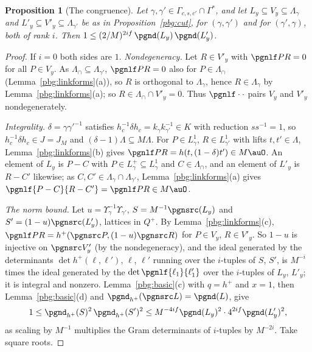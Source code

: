 \documentclass[10pt]{amsart}
\newtheorem{proposition}[theorem]{Proposition}
\theoremstyle{definition}
\theoremstyle{remark}
\begin{document}
\begin{proposition}[The congruence]\label{pbg:congr}
Let $\gamma,\gamma'\in\Gamma_{c,s,c'}\cap\Gamma^*$, and let $L_y\subseteq V_y\subseteq\Lambda_\gamma$ and
$L'_y\subseteq V'_y\subseteq\Lambda_{\gamma'}$ be as in Proposition~\ref{pbg:cut}, for $(\gamma,\gamma')$
and for $(\gamma',\gamma)$, both of rank $i$. Then $1\le(2/M)^{2if}\,\pgnd(L_y)\,\pgnd(L'_y)$.
\end{proposition}
\begin{proof}
If $i=0$ both sides are $1$. \emph{Nondegeneracy.} Let $R\in V'_y$ with $\pgnlf PR=0$ for all $P\in V_y$.
As $\Lambda_\cap\subseteq\Lambda_{\gamma'}$, $\pgnlf PR=0$ also for $P\in\Lambda_\cap$
(Lemma~\ref{pbg:linkforms}(a)), so $R$ is orthogonal to $\Lambda_\gamma$, hence $R\in\Lambda_\gamma$ by
Lemma~\ref{pbg:linkforms}(a); so $R\in\Lambda_\cap\cap V'_y=0$. Thus $\pgnlf\cdot\cdot$ pairs $V_y$ and
$V'_y$ nondegenerately.

\emph{Integrality.} $\delta=\gamma\gamma'^{-1}$ satisfies $h_c^{-1}\delta h_c=k_\gamma k_{\gamma'}^{-1}\in K$
with reduction $ss^{-1}=1$, so $h_c^{-1}\delta h_c\in J=J_M$ and $(\delta-1)\Lambda\subseteq M\Lambda$.
For $P\in L^1_\gamma$, $R\in L^1_{\gamma'}$ with lifts $t,t'\in\Lambda$, Lemma~\ref{pbg:linkforms}(b)
gives $\pgnlf PR=h(t,(1-\delta)t')\in M\auO$. An element of $L_y$ is $P-C$ with $P\in L^+_\gamma\subseteq
L^1_\gamma$ and $C\in\Lambda_\cap$, and an element of $L'_y$ is $R-C'$ likewise; as $C,C'\in\Lambda_
\gamma\cap\Lambda_{\gamma'}$, Lemma~\ref{pbg:linkforms}(a) gives $\pgnlf{P-C}{R-C'}=\pgnlf PR\in M\auO$.

\emph{The norm bound.} Let $u=\Upsilon_\gamma^{-1}\Upsilon_{\gamma'}$, $S=M^{-1}\pgnsrc(L_y)$ and $S'=(1-u)
\pgnsrc(L'_y)$, lattices in $Q^+$. By Lemma~\ref{pbg:linkforms}(c), $\pgnlf PR=h^+(\pgnsrc P,(1-u)\pgnsrc
R)$ for $P\in V_y$, $R\in V'_y$. So $1-u$ is injective on $\pgnsrc V'_y$ (by the nondegeneracy), and the
ideal generated by the determinants $\det h^+(\ell,\ell')$, $\ell$, $\ell'$ running over the $i$-tuples
of $S$, $S'$, is $M^{-i}$ times the ideal generated by the $\det\pgnlf{\ell_1}{\ell'_1}$ over the
$i$-tuples of $L_y$, $L'_y$; it is integral and nonzero. Lemma~\ref{pbg:basic}(c) with $q=h^+$ and $x=1$,
then Lemma~\ref{pbg:basic}(d) and $\pgnd_{h^+}(\pgnsrc L)=\pgnd(L)$, give
\[
1\le\pgnd_{h^+}(S)^2\,\pgnd_{h^+}(S')^2\le M^{-4if}\pgnd(L_y)^2\cdot4^{2if}\pgnd(L'_y)^2 ,
\]
as scaling by $M^{-1}$ multiplies the Gram determinants of $i$-tuples by $M^{-2i}$. Take square roots.
\end{proof}
\end{document}
